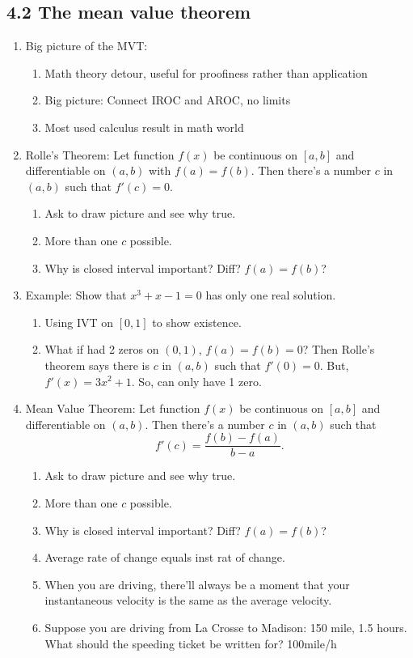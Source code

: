 \documentclass{article}
\begin{document}
\subsection{4.2 The mean value theorem}

\begin{enumerate}

\item Big picture of the MVT:
\begin{enumerate}
\item Math theory detour, useful for proofiness rather than application
\item Big picture: Connect IROC and AROC, no limits
\item Most used calculus result in math world
\end{enumerate}

\item Rolle's Theorem: Let function $f(x)$ be continuous on $[a,b]$ and differentiable on $(a,b)$ with $f(a)=f(b)$. Then there's a number $c$ in $(a,b)$ such that $f'(c) = 0$. 
\begin{enumerate}
\item Ask to draw picture and see why true.
\item More than one $c$ possible.
\item Why is closed interval important? Diff? $f(a)=f(b)$?
\end{enumerate}

\item Example: Show that $x^3+x-1 = 0$ has only one real solution.
\begin{enumerate}
\item Using IVT on $[0,1]$ to show existence.
\item What if had 2 zeros on $(0,1)$, $f(a)=f(b)=0$? Then Rolle's theorem says there is $c$ in $(a,b)$ such that $f'(0)=0$. But, $f'(x)=3x^2+1$. So, can only have 1 zero.
\end{enumerate}

\item Mean Value Theorem: Let function $f(x)$ be continuous on $[a,b]$ and differentiable on $(a,b)$. Then there's a number $c$ in $(a,b)$ such that 
\[
f'(c) = \frac{f(b)-f(a)}{b-a}.
\] 
\begin{enumerate}
\item Ask to draw picture and see why true.
\item More than one $c$ possible.
\item Why is closed interval important? Diff? $f(a)=f(b)$?
\item Average rate of change equals inst rat of change.
\item When you are driving, there'll always be a moment that your instantaneous velocity is the same as the average velocity.
\item Suppose you are driving from La Crosse to Madison: 150 mile, 1.5 hours. What should the speeding ticket be written for? 100mile/h
\end{enumerate}


\end{enumerate}
\end{document}
